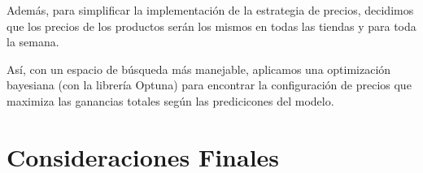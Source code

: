 \documentclass[12pt,a4paper]{article}
\begin{document}
\vspace{0.2cm}

Además, para simplificar la implementación de la estrategia de precios, decidimos que los precios de los productos serán los mismos en todas las tiendas y 
para toda la semana.

\vspace{0.2cm}

Así, con un espacio de búsqueda más manejable, aplicamos una optimización bayesiana (con la librería Optuna) para encontrar la configuración de precios 
que maximiza las ganancias totales según las predicicones del modelo.



\newpage

\section{Consideraciones Finales}
\end{document}
